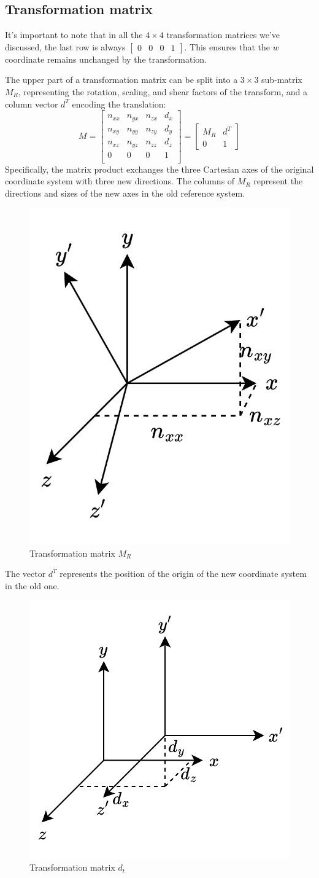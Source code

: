 \subsection{Transformation matrix}
It's important to note that in all the $4 \times 4$ transformation matrices we've discussed, the last row is always $\begin{bmatrix} 0 & 0 & 0 & 1\end{bmatrix}$. 
This ensures that the $w$ coordinate remains unchanged by the transformation.

The upper part of a transformation matrix can be split into a $3\times 3$ sub-matrix $M_R$, representing the rotation, scaling, and shear factors of the transform, and a column vector $d^T$ encoding the translation:
\[M=
\begin{bmatrix}
    n_{xx} & n_{yx} & n_{zx} & d_x \\ 
    n_{xy} & n_{yy} & n_{zy} & d_y \\
    n_{xz} & n_{yz} & n_{zz} & d_z \\
    0      & 0      & 0      & 1   \\
\end{bmatrix}= 
\begin{bmatrix}
    M_R & d^T \\ 
    0 & 1
\end{bmatrix}
\]
Specifically, the matrix product exchanges the three Cartesian axes of the original coordinate system with three new directions. 
The columns of $M_R$ represent the directions and sizes of the new axes in the old reference system.
\begin{figure}[H]
    \centering
    \includegraphics[width=0.3\linewidth]{images/mr.png}
    \caption{Transformation matrix $M_R$}
\end{figure}
The vector $d^T$ represents the position of the origin of the new coordinate system in the old one.
\begin{figure}[H]
    \centering
    \includegraphics[width=0.35\linewidth]{images/dt.png}
    \caption{Transformation matrix $d_t$}
\end{figure}
